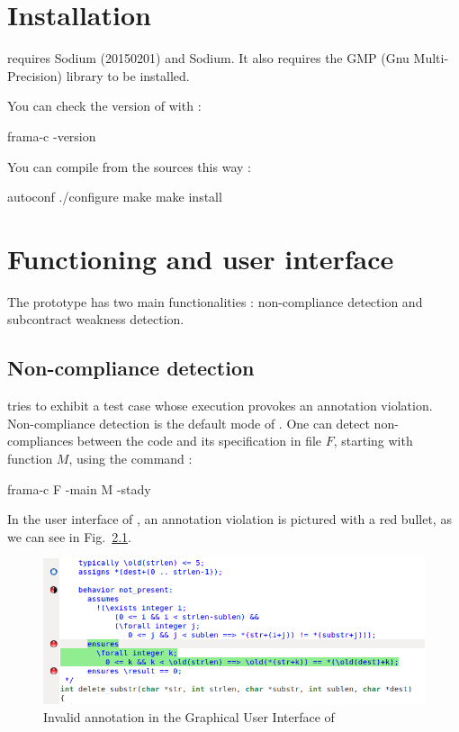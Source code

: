\documentclass[web]{frama-c-book}
\begin{document}

\chapter{Installation}


\stady requires \framac Sodium (20150201) and \pathcrawler Sodium. It also requires the GMP (Gnu Multi-Precision) library to be installed.

You can check the version of \framac with :

\begin{shell}
  frama-c -version
\end{shell}

You can compile \stady from the sources this way :

\begin{shell}
  autoconf
  ./configure
  make
  make install
\end{shell}



\chapter{Functioning and user interface}

The \stady prototype has two main functionalities : non-compliance detection and subcontract weakness detection.

\section{Non-compliance detection}

\stady tries to exhibit a test case whose execution provokes an annotation violation. Non-compliance detection is the default mode of \stady. One can detect non-compliances between the code and its specification in file $F$, starting with function $M$, using the command :

\begin{shell}
frama-c F -main M -stady
\end{shell}

In the user interface of \framac, an annotation violation is pictured with a red bullet, as we can see in Fig.~\ref{fig:gui}.

\begin{figure}\centering
  \includegraphics[scale=.4]{ppt_invalid.png}
  \caption{Invalid annotation in the Graphical User Interface of \framac
    \label{fig:gui}}
\end{figure}
\end{document}
